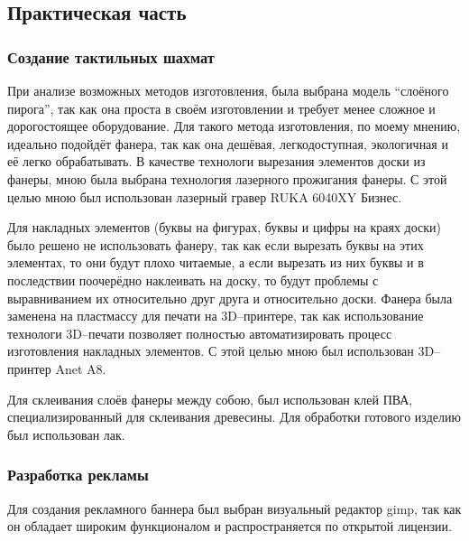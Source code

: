 \subsection{Практическая часть}
\subsubsection{Создание тактильных шахмат}
При анализе возможных методов изготовления, была выбрана модель ``слоёного
пирога'', так как она проста в своём изготовлении и требует менее сложное и
дорогостоящее оборудование. Для такого метода изготовления, по моему мнению,
идеально подойдёт фанера, так как она дешёвая, легкодоступная, экологичная и её
легко обрабатывать. В качестве технологи вырезания элементов доски из фанеры,
мною была выбрана технология лазерного прожигания фанеры. С этой целью мною был
использован лазерный гравер RUKA 6040XY Бизнес.

Для накладных элементов (буквы на фигурах, буквы и цифры на краях доски) было
решено не использовать фанеру, так как если вырезать буквы на этих элементах,
то они будут плохо читаемые, а если вырезать из них буквы и в последствии
поочерёдно наклеивать на доску, то будут проблемы с выравниванием их
относительно друг друга и относительно доски. Фанера была заменена на
пластмассу для печати на 3D--принтере, так как использование технологи
3D--печати позволяет полностью автоматизировать процесс изготовления накладных
элементов. С этой целью мною был использован 3D--принтер Anet A8.

Для склеивания слоёв фанеры между собою, был использован клей ПВА,
специализированный для склеивания древесины. Для обработки готового изделию был
использован лак. 

\subsubsection{Разработка рекламы}
Для создания рекламного баннера был выбран визуальный редактор \acrshort{gimp},
так как он обладает широким функционалом и распространяется по открытой
лицензии.

